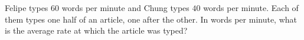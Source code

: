 Felipe types $60$ words per minute and Chung types $40$ words per minute. Each of them types one half of an article, one after the other. In words per minute, what is the average rate at which the article was typed?
